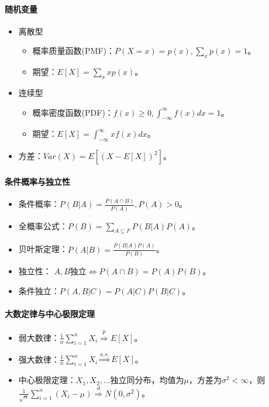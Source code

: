 \documentclass[
12pt, %
a4paper, 
oneside, %
headinclude,footinclude, %
]{scrartcl}
\begin{document}
\paragraph{随机变量}
\begin{itemize}
\item 离散型
\begin{itemize}
\item 概率质量函数(PMF)：$ P(X = x) = p(x), \sum_{x} p(x) = 1 $。
\item 期望：$ E[X] = \sum_{x} x p(x) $。
\end{itemize}
\item 连续型
\begin{itemize}
\item 概率密度函数(PDF)：$ f(x) \geq 0, \int_{-\infty}^{\infty} f(x) dx = 1 $。
\item 期望：$ E[X] = \int_{-\infty}^{\infty} x f(x) dx $。
\end{itemize}
\item 方差：$ Var(X) = E[(X - E[X])^2] $。
\end{itemize}
\paragraph{条件概率与独立性}
\begin{itemize}
\item 条件概率：$ P(B|A) = \frac{P(A \cap B)}{P(A)}, P(A) > 0 $。
\item 全概率公式：$ P(B) = \sum_{A \subseteq F} P(B|A) P(A) $。
\item 贝叶斯定理：$ P(A|B) = \frac{P(B|A) P(A)}{P(B)} $。
\item 独立性： $ A,B $独立$ \iff $$ P(A \cap B) = P(A)P(B) $。
\item 条件独立：$ P(A ,B|C) = P(A|C)P(B|C) $。
\end{itemize}
\paragraph{大数定律与中心极限定理}
\begin{itemize}
\item 弱大数律：$ \frac{1}{n} \sum_{i = 1}^n X_i \overset{p}{\Longrightarrow} E[X] $。
\item 强大数律：$ \frac{1}{n} \sum_{i = 1}^n X_i \overset{a.s.}{\Longrightarrow} E[X] $。
\item 中心极限定理：$ X_1, X_2, \dots $独立同分布，均值为$ \mu $，方差为$ \sigma^2 < \infty $，则$ \frac{1}{\sqrt{n}} \sum_{i = 1}^n (X_i - \mu) \overset{d}{\Longrightarrow} N(0, \sigma^2) $。
\end{itemize}
\end{document}
